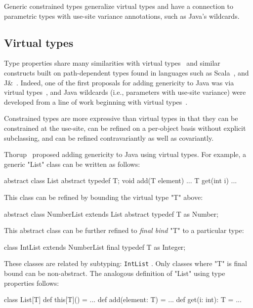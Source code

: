 
Generic constrained types generalize virtual types and 
have a connection to parametric types with use-site variance
annotations, such as Java's wildcards.  

\subsection{Virtual types}

Type properties share many similarities with virtual
types~\cite{mp89-virtual-classes,beta,ernst99-gbeta,ernst06-virtual,cdnw07-tribe}
and similar constructs built on path-dependent types found in
languages such as Scala~\cite{scala}, and J\&~\cite{nqm06}.
Indeed, one of the first proposals for adding genericity to Java
was via virtual types~\cite{thorup97}, and Java
wildcards (i.e., parameters with use-site variance)
were developed from a line of work beginning with virtual
types~\cite{unifying-genericity,variant-parametric-types,adding-wildcards}.

Constrained types are more expressive than virtual
types in that they can be constrained at the use-site,
can be refined on a per-object basis without explicit subclassing,
and can be refined contravariantly
as well as covariantly. 

Thorup~\cite{thorup97}
proposed adding genericity to Java using virtual types.  For example,
a generic \xcd"List" class can be written as follows:
{\footnotesize
\begin{xten}
abstract class List {
  abstract typedef T;
  void add(T element) { ... }
  T get(int i) { ... }
}
\end{xten}}
This class can be refined by bounding the virtual type \xcd"T" above:
{\footnotesize
\begin{xten}
abstract class NumberList extends List {
  abstract typedef T as Number;
}
\end{xten}}
This abstract class can be further refined to \emph{final bind}
\xcd"T" to a particular type:
{\footnotesize
\begin{xten}
class IntList extends NumberList {
  final typedef T as Integer;
}
\end{xten}}
These classes are related by subtyping:
{\tt IntList}  .
Only classes where \xcd"T" is final bound can be non-abstract.
%
The analogous definition of 
\xcd"List" using type properties follows:
{\footnotesize
\begin{xten}
class List[T] {
  def this[T]() = { ... }
  def add(element: T) = { ... }
  def get(i: int): T = { ... }
}
\end{xten}}

